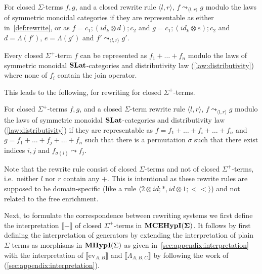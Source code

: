 \begin{defi}
	For closed $\Sigma$-terms $f,g$, and a closed rewrite rule $\langle l, r \rangle$, $f \leadsto_{\langle l, r \rangle} g$ modulo the laws of symmetric monoidal categories if they are representable as either in~\autoref{def:rewrite}, or as
	$
		f = c_{1};(id_{k} \otimes d);c_{2} $ and $ g = c_{1};(id_{k} \otimes e);c_{2}
	$
	and $d = \Lambda(f')$, $e = \Lambda(g')$ and $f' \leadsto_{\langle l, r \rangle} g'$.
\end{defi}
\begin{lem}
	\label{lemma:normal_form}
	Every closed $\Sigma^{+}$-term $f$ can be represented as
	$
		f_{1} + \ldots + f_{n}
	$ modulo the laws of symmetric monoidal $\mathbf{SLat}$-categories and distributivity law (\autoref{law:distributivity}) where none of $f_{i}$ contain the join operator.
\end{lem}
This leads to the following, for rewriting for closed $\Sigma^{+}$-terms.
\begin{defi}
	For closed $\Sigma^{+}$-terms $f,g$, and a closed $\Sigma$-term rewrite rule $\langle l, r \rangle$, $f \leadsto_{\langle l, r \rangle} g$ modulo the laws of symmetric monoidal $\mathbf{SLat}$-categories and distributivity law (\autoref{law:distributivity}) if they are representable as
	$
		f = f_{1} + \ldots + f_{i} + \ldots + f_{n} $ and $ g = f_{1} + \ldots + f_{j} + \ldots + f_{n}
	$
	such that there is a permutation $\sigma$ such that there exist indices $i,j$ and $f_{\sigma(i)} \leadsto f_{j}$.
\end{defi}
Note that the rewrite rule consist of closed $\Sigma$-terms and not of closed $\Sigma^{+}$-terms, i.e.\ neither $l$ nor $r$ contain any $+$.
This is intentional as these rewrite rules are supposed to be domain-specific (like a rule $\langle 2 \otimes id;*, id \otimes 1; <\!\!< \rangle$) and not related to the free enrichment.

Next, to formulate the correspondence between rewriting systems we first define the interpretation $\llbracket - \rrbracket$ of closed $\Sigma^{+}$-terms in ${\mathbf{MCEHypI(\Sigma)}}$.
It follows by first defining the interpretation of generators by extending the interpretation of plain $\Sigma$-terms as morphisms in $\textbf{MHypI}(\Sigma)$ as given in~\autoref{sec:appendix:interpretation} with the interpretation of $\llbracket \text{ev}_{A,B}\rrbracket$ and $\llbracket \Lambda_{A,B,C} \rrbracket$ by following the work of~\citet{fscd} (\autoref{sec:appendix:interpretation}).

